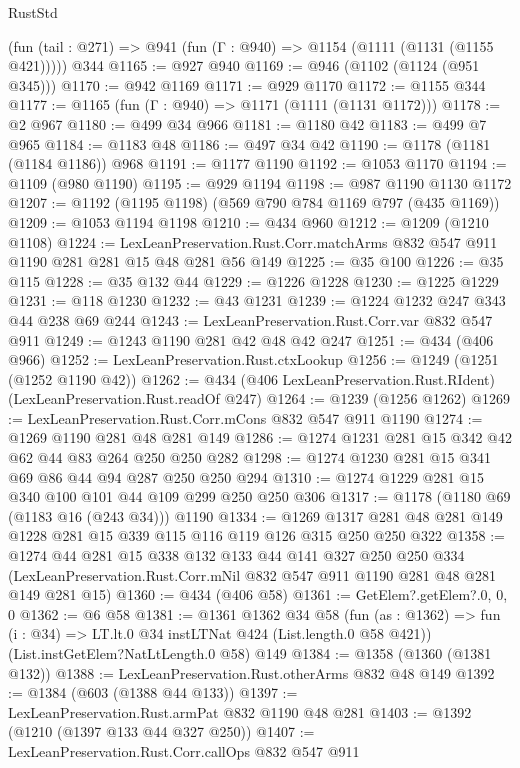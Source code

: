 \begin{lexlean}{RustStd}
\begin{coremodule}
    (fun (tail : @271) => @941 (fun (Γ : @940) => @1154 (@1111 (@1131 (@1155 @421)))))
    @344
@1165 := @927 @940
@1169 := @946 (@1102 (@1124 (@951 @345)))
@1170 := @942 @1169
@1171 := @929 @1170
@1172 := @1155 @344
@1177 := @1165 (fun (Γ : @940) => @1171 (@1111 (@1131 @1172)))
@1178 := @2 @967
@1180 := @499 @34 @966
@1181 := @1180 @42
@1183 := @499 @7 @965
@1184 := @1183 @48
@1186 := @497 @34 @42
@1190 := @1178 (@1181 (@1184 @1186)) @968
@1191 := @1177 @1190
@1192 := @1053 @1170
@1194 := @1109 (@980 @1190)
@1195 := @929 @1194
@1198 := @987 @1190 @1130 @1172
@1207 := @1192 (@1195 @1198) (@569 @790 @784 @1169 @797 (@435 @1169))
@1209 := @1053 @1194 @1198
@1210 := @434 @960
@1212 := @1209 (@1210 @1108)
@1224 := LexLeanPreservation.Rust.Corr.matchArms
    @832
    @547
    @911
    @1190
    @281
    @281
    @15
    @48
    @281
    @56
    @149
@1225 := @35 @100
@1226 := @35 @115
@1228 := @35 @132 @44
@1229 := @1226 @1228
@1230 := @1225 @1229
@1231 := @118 @1230
@1232 := @43 @1231
@1239 := @1224 @1232 @247 @343 @44 @238 @69 @244
@1243 := LexLeanPreservation.Rust.Corr.var @832 @547 @911
@1249 := @1243 @1190 @281 @42 @48 @42 @247
@1251 := @434 (@406 @966)
@1252 := LexLeanPreservation.Rust.ctxLookup
@1256 := @1249 (@1251 (@1252 @1190 @42))
@1262 := @434 (@406 LexLeanPreservation.Rust.RIdent) (LexLeanPreservation.Rust.readOf @247)
@1264 := @1239 (@1256 @1262)
@1269 := LexLeanPreservation.Rust.Corr.mCons @832 @547 @911 @1190
@1274 := @1269 @1190 @281 @48 @281 @149
@1286 := @1274 @1231 @281 @15 @342 @42 @62 @44 @83 @264 @250 @250 @282
@1298 := @1274 @1230 @281 @15 @341 @69 @86 @44 @94 @287 @250 @250 @294
@1310 := @1274 @1229 @281 @15 @340 @100 @101 @44 @109 @299 @250 @250 @306
@1317 := @1178 (@1180 @69 (@1183 @16 (@243 @34))) @1190
@1334 := @1269 @1317 @281 @48 @281 @149 @1228 @281 @15 @339 @115 @116 @119 @126 @315 @250 @250 @322
@1358 := @1274
    @44
    @281
    @15
    @338
    @132
    @133
    @44
    @141
    @327
    @250
    @250
    @334
    (LexLeanPreservation.Rust.Corr.mNil @832 @547 @911 @1190 @281 @48 @281 @149 @281 @15)
@1360 := @434 (@406 @58)
@1361 := GetElem?.getElem?.{0, 0, 0}
@1362 := @6 @58
@1381 := @1361
    @1362
    @34
    @58
    (fun (as : @1362) => fun (i : @34) => LT.lt.{0} @34 instLTNat @424 (List.length.{0} @58 @421))
    (List.instGetElem?NatLtLength.{0} @58)
    @149
@1384 := @1358 (@1360 (@1381 @132))
@1388 := LexLeanPreservation.Rust.otherArms @832 @48 @149
@1392 := @1384 (@603 (@1388 @44 @133))
@1397 := LexLeanPreservation.Rust.armPat @832 @1190 @48 @281
@1403 := @1392 (@1210 (@1397 @133 @44 @327 @250))
@1407 := LexLeanPreservation.Rust.Corr.callOps @832 @547 @911

\end{coremodule}
\end{lexlean}
